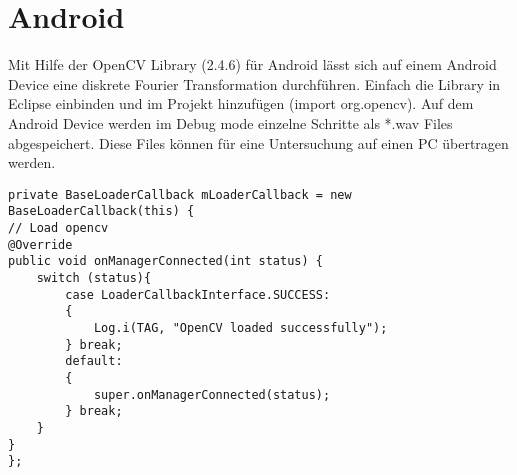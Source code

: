 \documentclass[10pt]{scrartcl}
\begin{document}
\clearpage
\newpage
\part{Android}
Mit Hilfe der OpenCV Library (2.4.6) für Android lässt sich auf einem Android Device eine diskrete Fourier Transformation durchführen. Einfach die Library in Eclipse einbinden und im Projekt hinzufügen (import org.opencv). Auf dem Android Device werden im Debug mode einzelne Schritte als *.wav Files abgespeichert. Diese Files können für eine Untersuchung auf einen PC übertragen werden.

\begin{tiny}
\begin{lstlisting}
private BaseLoaderCallback mLoaderCallback = new BaseLoaderCallback(this) {
// Load opencv
@Override
public void onManagerConnected(int status) {
	switch (status){
		case LoaderCallbackInterface.SUCCESS:
		{
			Log.i(TAG, "OpenCV loaded successfully");                  
		} break;
		default:
		{
			super.onManagerConnected(status);
		} break;
	}
}
};
\end{lstlisting}
\end{tiny}
\end{document}
